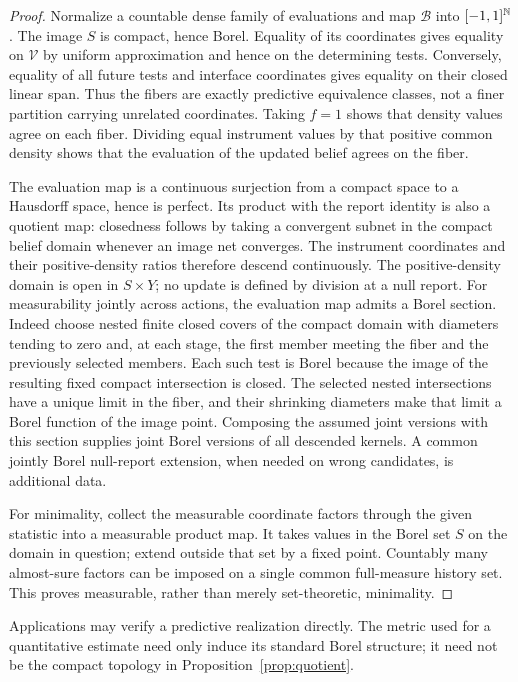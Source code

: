 \begin{proof}
Normalize a countable dense family of evaluations and map $\mathcal B$ into $[-1,1]^{\mathbb N}$. The image $S$ is compact, hence Borel. Equality of its coordinates gives equality on $\mathcal V$ by uniform approximation and hence on the determining tests. Conversely, equality of all future tests and interface coordinates gives equality on their closed linear span. Thus the fibers are exactly predictive equivalence classes, not a finer partition carrying unrelated coordinates. Taking $f=1$ shows that density values agree on each fiber. Dividing equal instrument values by that positive common density shows that the evaluation of the updated belief agrees on the fiber.

The evaluation map is a continuous surjection from a compact space to a Hausdorff space, hence is perfect. Its product with the report identity is also a quotient map: closedness follows by taking a convergent subnet in the compact belief domain whenever an image net converges. The instrument coordinates and their positive-density ratios therefore descend continuously. The positive-density domain is open in $S\times Y$; no update is defined by division at a null report. For measurability jointly across actions, the evaluation map admits a Borel section. Indeed choose nested finite closed covers of the compact domain with diameters tending to zero and, at each stage, the first member meeting the fiber and the previously selected members. Each such test is Borel because the image of the resulting fixed compact intersection is closed. The selected nested intersections have a unique limit in the fiber, and their shrinking diameters make that limit a Borel function of the image point. Composing the assumed joint versions with this section supplies joint Borel versions of all descended kernels. A common jointly Borel null-report extension, when needed on wrong candidates, is additional data.

For minimality, collect the measurable coordinate factors through the given statistic into a measurable product map. It takes values in the Borel set $S$ on the domain in question; extend outside that set by a fixed point. Countably many almost-sure factors can be imposed on a single common full-measure history set. This proves measurable, rather than merely set-theoretic, minimality.
\end{proof}

Applications may verify a predictive realization directly. The metric used for a quantitative estimate need only induce its standard Borel structure; it need not be the compact topology in Proposition~\ref{prop:quotient}.

